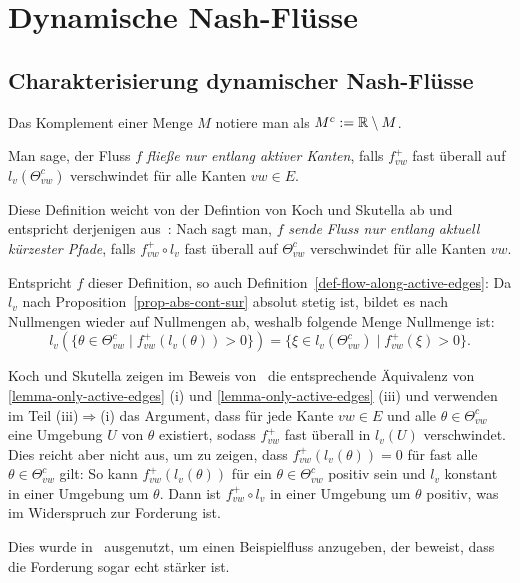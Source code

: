 \section{Dynamische Nash-Flüsse}\label{sec-nash-flows}

\subsection{Charakterisierung dynamischer Nash-Flüsse}

\begin{notation}
	Das Komplement einer Menge $M$ notiere man als $M^c:= \mathbb{R}\setminus M$.
\end{notation}

\begin{definition}\label{def-flow-along-active-edges}
	Man sage, der Fluss $f$ \emph{fließe nur entlang aktiver Kanten}, falls $f_{vw}^+$ fast überall auf $l_v(\Theta_{vw}^c)$ verschwindet für alle Kanten $vw\in E$.
\end{definition}

\begin{remark}
	Diese Definition weicht von der Defintion von Koch und Skutella ab und entspricht derjenigen aus~\cite[Definition 1]{Cominetti2015}:
	Nach \cite[Definition 2]{Koch2011} sagt man, $f$ \emph{sende Fluss nur entlang aktuell kürzester Pfade}, falls $f_{vw}^+\circ l_v$ fast überall auf $\Theta_{vw}^c$ verschwindet für alle Kanten $vw$.
	
	Entspricht $f$ dieser Definition, so auch Definition~\ref{def-flow-along-active-edges}: 
	Da $l_v$ nach Proposition~\ref{prop-abs-cont-sur} absolut stetig ist, bildet es nach~\cite[Aufgabe 4.9]{Elstrodt2011} Nullmengen wieder auf Nullmengen ab, weshalb folgende Menge Nullmenge ist: $$l_v(\{ \theta \in \Theta_{vw}^c \mid f_{vw}^+ (l_v(\theta)) > 0 \}) = \{ \xi \in l_v(\Theta_{vw}^c) \mid f_{vw}^+ (\xi) > 0 \}.$$
	 
	Koch und Skutella zeigen im Beweis von~\cite[Lemma 1]{Koch2011} die entsprechende Äquivalenz von \ref{lemma-only-active-edges} (i) und \ref{lemma-only-active-edges} (iii) und
	verwenden im Teil (iii)$\Rightarrow$(i) das Argument, dass für jede Kante $vw\in E$ und alle $\theta\in \Theta_{vw}^c$ eine Umgebung $U$ von $\theta$ existiert, sodass $f_{vw}^+$ fast überall in $l_v(U)$ verschwindet.
	Dies reicht aber nicht aus, um zu zeigen, dass $f_{vw}^+(l_v(\theta))=0$ für fast alle $\theta\in\Theta_{vw}^c$ gilt:
	So kann $f_{vw}^+(l_v(\theta))$ für ein $\theta\in\Theta_{vw}^c$ positiv sein und $l_v$ konstant in einer Umgebung um $\theta$.
	Dann ist $f_{vw}^+ \circ l_v$ in einer Umgebung um $\theta$ positiv, was im Widerspruch zur Forderung ist.
	
	Dies wurde in~\cite[Example 2]{Cominetti2015} ausgenutzt, um einen Beispielfluss anzugeben, der beweist, dass die Forderung sogar echt stärker ist.
\end{remark}


